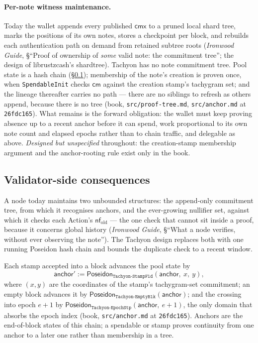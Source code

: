 \documentclass[11pt,a4paper]{article}
\theoremstyle{definition}
\newcommand{\nfsym}{\mathsf{nf}}
\newcommand{\cmsym}{\mathsf{cm}}
\newcommand{\cmx}{\mathsf{cmx}}
\begin{document}
\paragraph{Per-note witness maintenance.} Today the wallet appends every
published $\cmx$ to a pruned local shard tree, marks the positions of its own
notes, stores a checkpoint per block, and rebuilds each authentication path
on demand from retained subtree roots (\emph{Ironwood Guide}, \S``Proof of
ownership of \emph{some} valid note: the commitment tree''; the design of
librustzcash's \textsf{shardtree}). Tachyon has no note commitment tree.
Pool state is a hash chain (\S\ref{sec:tachyon-validators}); membership of
the note's creation is proven once, when \texttt{SpendableInit} checks
$\cmsym$ against the creation stamp's tachygram set; and the lineage
thereafter carries no path --- there are no siblings to refresh as others
append, because there is no tree (book, \texttt{src/proof-tree.md},
\texttt{src/anchor.md} at \texttt{26fdc165}). What remains is the forward
obligation: the wallet must keep proving absence up to a recent anchor
before it can spend, work proportional to its own note count and elapsed
epochs rather than to chain traffic, and delegable as above. \emph{Designed
but unspecified} throughout: the creation-stamp membership argument and the
anchor-rooting rule exist only in the book.

\subsection{Validator-side consequences}\label{sec:tachyon-validators}

A node today maintains two unbounded structures: the append-only commitment
tree, from which it recognises anchors, and the ever-growing nullifier set,
against which it checks each Action's $\nfsym_{\mathrm{old}}$ --- the one
check that cannot sit inside a proof, because it concerns global history
(\emph{Ironwood Guide}, \S``What a node verifies, without ever observing the
note''). The Tachyon design replaces both with one running Poseidon hash
chain and bounds the duplicate check to a recent window.

Each stamp accepted into a block advances the pool state by
\[
\mathsf{anchor}' :=
  \mathsf{Poseidon}_{\texttt{Tachyon-StampFld}}(\mathsf{anchor},\ x,\ y),
\]
where $(x, y)$ are the coordinates of the stamp's tachygram-set commitment;
an empty block advances it by
$\mathsf{Poseidon}_{\texttt{Tachyon-EmptyBlk}}(\mathsf{anchor})$; and the
crossing into epoch $e + 1$ by
$\mathsf{Poseidon}_{\texttt{Tachyon-EpochStp}}(\mathsf{anchor},\ e + 1)$,
the only domain that absorbs the epoch index (book, \texttt{src/anchor.md}
at \texttt{26fdc165}). Anchors are the end-of-block states of this chain; a
spendable or stamp proves continuity from one anchor to a later one rather
than membership in a tree.
\end{document}
